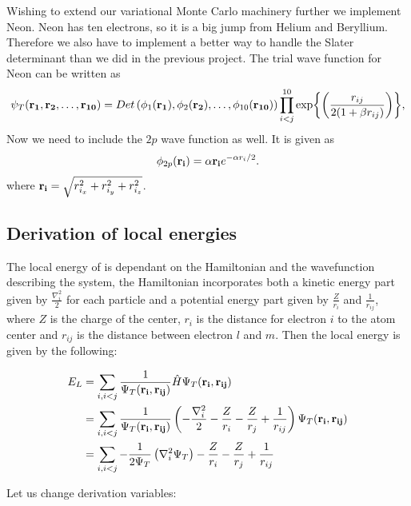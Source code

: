 \documentclass[11pt]{article}
\begin{document}
		Wishing to extend our variational Monte Carlo machinery further we implement Neon. Neon has ten electrons, so it is a big jump from Helium and Beryllium. Therefore we also have to implement a better way to handle the Slater determinant than we did in the previous project. The trial wave function for Neon can be written as
		\begin{equation}
		   \psi_{T}({\bf r_1},{\bf r_2}, \dots,{\bf r_{10}}) =
		   Det\left(\phi_{1}({\bf r_1}),\phi_{2}({\bf r_2}),
		   \dots,\phi_{10}({\bf r_{10}})\right)
		   \prod_{i<j}^{10}\exp{\left(\frac{r_{ij}}{2(1+\beta r_{ij})}\right)},
		   \label{eq:NeonTrialFunction}
		\end{equation}
		Now we need to include the $2p$ wave function as well. It is given as
		\begin{equation}
			\phi_{2p}({\bf r_i}) = \alpha {\bf r_i}e^{-\alpha r_i/2}.
		\end{equation}
		where $ {\bf r_i} = \sqrt{r_{i_x}^2+r_{i_y}^2+r_{i_z}^2}$.

	\subsection{Derivation of local energies}
		The local energy of is dependant on the Hamiltonian and the wavefunction describing the system, the Hamiltonian incorporates both a kinetic energy part given by \( \frac{\nabla_i^2}{2} \) for each particle
		and a potential energy part given by \(\frac{Z}{r_i}\) and \(\frac{1}{r_{ij}}\), where \(Z\) is the charge of the center, \(r_i\) is the distance for electron \(i\) to the atom center and \(r_{ij}\) is the distance between electron \(l\) and \(m\). Then the local energy is given by the following:

		\begin{align}
			E_L &= \sum_{i,i<j}{\frac{1}{ \Psi_T(\vb{r_i} , \vb{r_{ij}}) } \hat{H} \Psi_T(\vb{r_i} , \vb{r_{ij}})}
			\\
			&=	\sum_{i,i<j}\frac{1}{ \Psi_T(\vb{r_i} , \vb{r_{ij}}) } \left( - \frac{\nabla_i^2}{2} -\frac{Z}{r_i}  -  \frac{Z}{r_j} +  \frac{1}{r_{ij} }  \right) \Psi_T(\vb{r_i} , \vb{r_{ij}})
			\\
			&= \sum_{i,i<j}{-\frac{1}{2\Psi_T} \left(\nabla_i^2 \Psi_T  \right)  -\frac{Z}{r_i}  -  \frac{Z}{r_j} +  \frac{1}{r_{ij} }}
		\end{align}

		Let us change derivation variables:
\end{document}
